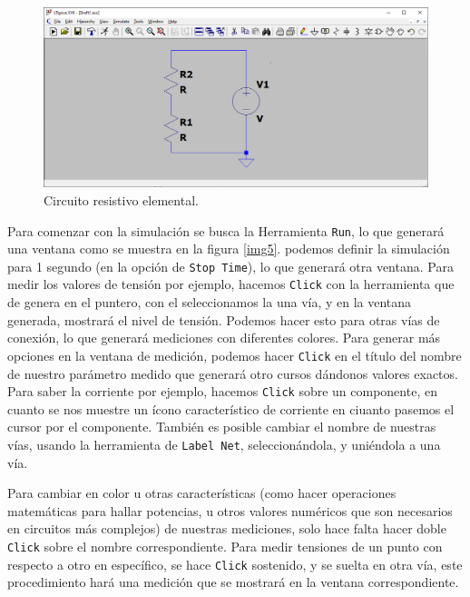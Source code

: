 \documentclass[a4paper]{article} %
\begin{document}
\begin{figure} %
	\centering %
	\includegraphics[scale=0.5]{IMAGENES/img4} %
	\caption{Circuito resistivo elemental.} %
	\label{img4} %
\end{figure} %

Para comenzar con la simulación se busca la Herramienta \texttt{Run}, lo que generará una ventana como se muestra en la figura \eqref{img5}. podemos definir la simulación para 1 segundo (en la opción de \texttt{Stop Time}), lo que generará otra ventana. Para medir los valores de tensión por ejemplo, hacemos \texttt{Click} con la herramienta que de genera en el puntero, con el seleccionamos la una vía, y en la ventana generada, mostrará el nivel de tensión. Podemos hacer esto para otras vías de conexión, lo que generará mediciones con diferentes colores. Para generar más opciones en la ventana de medición, podemos hacer \texttt{Click} en el título del nombre de nuestro parámetro medido que generará otro cursos dándonos valores exactos. Para saber la corriente por ejemplo, hacemos \texttt{Click} sobre un componente, en cuanto se nos muestre un ícono característico de corriente en ciuanto pasemos el cursor por el componente. También es posible cambiar el nombre de nuestras vías, usando la herramienta de \texttt{Label Net}, seleccionándola, y uniéndola a una vía. 


Para cambiar en color u otras características (como hacer operaciones matemáticas para hallar potencias, u otros valores numéricos que son necesarios en circuitos más complejos) de nuestras mediciones, solo hace falta hacer doble \texttt{Click} sobre el nombre correspondiente. Para medir tensiones de un punto con respecto a otro en específico, se hace \texttt{Click} sostenido, y se suelta en otra vía, este procedimiento hará una medición que se mostrará en la ventana correspondiente. 
\end{document}
